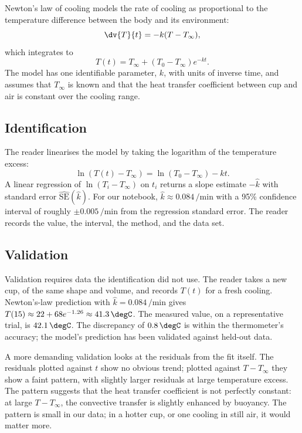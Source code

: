 Newton's law of cooling models the rate of cooling as proportional
to the temperature difference between the body and its environment:
\[
\dv{T}{t} = -k (T - T_{\infty}),
\]
which integrates to
\[
T(t) = T_{\infty} + (T_{0} - T_{\infty}) e^{-kt}.
\]
The model has one identifiable parameter, $k$, with units of
inverse time, and assumes that $T_{\infty}$ is known and that the
heat transfer coefficient between cup and air is constant over the
cooling range.

\subsection{Identification}

The reader linearises the model by taking the logarithm of the
temperature excess:
\[
\ln(T(t) - T_{\infty}) = \ln(T_{0} - T_{\infty}) - kt.
\]
A linear regression of $\ln(T_{i} - T_{\infty})$ on $t_{i}$
returns a slope estimate $-\hat k$ with standard error
$\hat{\mathrm{SE}}(\hat k)$. For our notebook,
$\hat k \approx 0.084\,\si{\per\minute}$ with a 95\% confidence
interval of roughly $\pm 0.005\,\si{\per\minute}$ from the
regression standard error. The reader records the value, the
interval, the method, and the data set.

\subsection{Validation}

Validation requires data the identification did not use. The
reader takes a new cup, of the same shape and volume, and records
$T(t)$ for a fresh cooling. Newton's-law prediction with
$\hat k = 0.084\,\si{\per\minute}$ gives
$T(15) \approx 22 + 68 e^{-1.26} \approx 41.3\,\degC$. The
measured value, on a representative trial, is $42.1\,\degC$. The
discrepancy of $0.8\,\degC$ is within the thermometer's accuracy;
the model's prediction has been validated against held-out data.

A more demanding validation looks at the residuals from the fit
itself. The residuals plotted against $t$ show no obvious trend;
plotted against $T - T_{\infty}$ they show a faint pattern, with
slightly larger residuals at large temperature excess. The pattern
suggests that the heat transfer coefficient is not perfectly
constant: at large $T - T_{\infty}$, the convective transfer
is slightly enhanced by buoyancy. The pattern is small in our
data; in a hotter cup, or one cooling in still air, it would
matter more.


